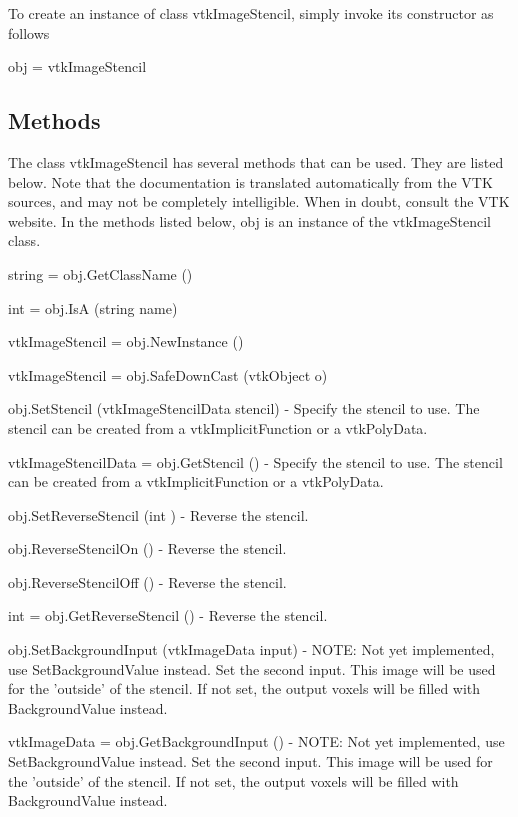 To create an instance of class vtk\-Image\-Stencil, simply invoke its constructor as follows \begin{DoxyVerb}  obj = vtkImageStencil
\end{DoxyVerb}
 \hypertarget{vtkwidgets_vtkxyplotwidget_Methods}{}\subsection{Methods}\label{vtkwidgets_vtkxyplotwidget_Methods}
The class vtk\-Image\-Stencil has several methods that can be used. They are listed below. Note that the documentation is translated automatically from the V\-T\-K sources, and may not be completely intelligible. When in doubt, consult the V\-T\-K website. In the methods listed below, {\ttfamily obj} is an instance of the vtk\-Image\-Stencil class. 
\begin{DoxyItemize}
\item {\ttfamily string = obj.\-Get\-Class\-Name ()}  
\item {\ttfamily int = obj.\-Is\-A (string name)}  
\item {\ttfamily vtk\-Image\-Stencil = obj.\-New\-Instance ()}  
\item {\ttfamily vtk\-Image\-Stencil = obj.\-Safe\-Down\-Cast (vtk\-Object o)}  
\item {\ttfamily obj.\-Set\-Stencil (vtk\-Image\-Stencil\-Data stencil)} -\/ Specify the stencil to use. The stencil can be created from a vtk\-Implicit\-Function or a vtk\-Poly\-Data.  
\item {\ttfamily vtk\-Image\-Stencil\-Data = obj.\-Get\-Stencil ()} -\/ Specify the stencil to use. The stencil can be created from a vtk\-Implicit\-Function or a vtk\-Poly\-Data.  
\item {\ttfamily obj.\-Set\-Reverse\-Stencil (int )} -\/ Reverse the stencil.  
\item {\ttfamily obj.\-Reverse\-Stencil\-On ()} -\/ Reverse the stencil.  
\item {\ttfamily obj.\-Reverse\-Stencil\-Off ()} -\/ Reverse the stencil.  
\item {\ttfamily int = obj.\-Get\-Reverse\-Stencil ()} -\/ Reverse the stencil.  
\item {\ttfamily obj.\-Set\-Background\-Input (vtk\-Image\-Data input)} -\/ N\-O\-T\-E\-: Not yet implemented, use Set\-Background\-Value instead. Set the second input. This image will be used for the 'outside' of the stencil. If not set, the output voxels will be filled with Background\-Value instead.  
\item {\ttfamily vtk\-Image\-Data = obj.\-Get\-Background\-Input ()} -\/ N\-O\-T\-E\-: Not yet implemented, use Set\-Background\-Value instead. Set the second input. This image will be used for the 'outside' of the stencil. If not set, the output voxels will be filled with Background\-Value instead.  

\end{DoxyItemize}
